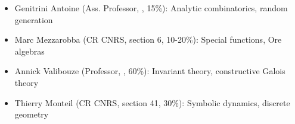 \begin{itemize}

\item Genitrini Antoine (Ass. Professor, \cs, 15\%): %
  Analytic combinatorics, random generation
\item Marc Mezzarobba (CR CNRS, section 6, 10-20\%): %
  Special functions, Ore algebras
\item Annick Valibouze (Professor, \cs, 60\%): %
  Invariant theory, %
  constructive Galois theory




\item Thierry Monteil (CR CNRS, section 41, 30\%): %
  Symbolic dynamics, discrete
  geometry%


\end{itemize}
